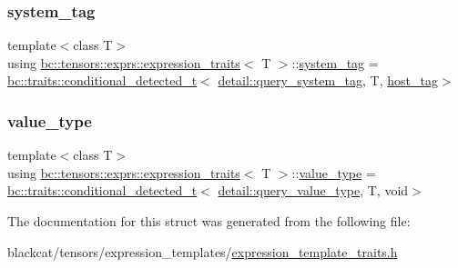 \mbox{\label{structbc_1_1tensors_1_1exprs_1_1expression__traits_a13a9bbc7ab291f35143c611ff93f69de}} 
\subsubsection{\texorpdfstring{system\+\_\+tag}{system\_tag}}
{\footnotesize\ttfamily template$<$class T$>$ \\
using \hyperlink{structbc_1_1tensors_1_1exprs_1_1expression__traits}{bc\+::tensors\+::exprs\+::expression\+\_\+traits}$<$ T $>$\+::\hyperlink{structbc_1_1tensors_1_1exprs_1_1expression__traits_a13a9bbc7ab291f35143c611ff93f69de}{system\+\_\+tag} =  \hyperlink{namespacebc_1_1traits_a1a6d378947ec32acd457890854bcd592}{bc\+::traits\+::conditional\+\_\+detected\+\_\+t}$<$ \hyperlink{namespacebc_1_1tensors_1_1exprs_1_1detail_aa067b2ce78c8e7218f47bded8aec80a8}{detail\+::query\+\_\+system\+\_\+tag}, T, \hyperlink{structbc_1_1host__tag}{host\+\_\+tag}$>$}

\mbox{\label{structbc_1_1tensors_1_1exprs_1_1expression__traits_ab4830d8c42c308632e269d6a8de49e83}} 
\subsubsection{\texorpdfstring{value\+\_\+type}{value\_type}}
{\footnotesize\ttfamily template$<$class T$>$ \\
using \hyperlink{structbc_1_1tensors_1_1exprs_1_1expression__traits}{bc\+::tensors\+::exprs\+::expression\+\_\+traits}$<$ T $>$\+::\hyperlink{structbc_1_1tensors_1_1exprs_1_1expression__traits_ab4830d8c42c308632e269d6a8de49e83}{value\+\_\+type} =  \hyperlink{namespacebc_1_1traits_a1a6d378947ec32acd457890854bcd592}{bc\+::traits\+::conditional\+\_\+detected\+\_\+t}$<$ \hyperlink{namespacebc_1_1tensors_1_1exprs_1_1detail_aa60e0a71bcf8048661b38b904c620fb0}{detail\+::query\+\_\+value\+\_\+type}, T, void$>$}



The documentation for this struct was generated from the following file\+:\begin{DoxyCompactItemize}
\item 
blackcat/tensors/expression\+\_\+templates/\hyperlink{expression__template__traits_8h}{expression\+\_\+template\+\_\+traits.\+h}\end{DoxyCompactItemize}
